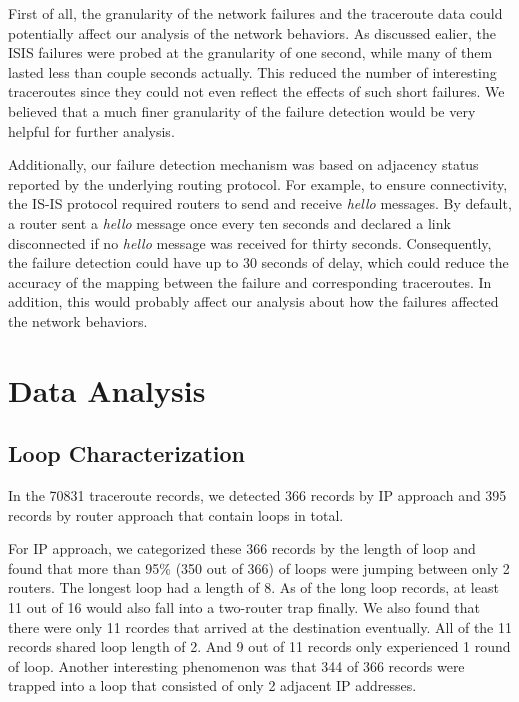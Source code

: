 \documentclass[conference, twocolumn, oneside, 10pt]{IEEEtran}
\begin{document}
First of all, the granularity of the network failures and the traceroute data could potentially affect our analysis of the network behaviors. As discussed ealier, the ISIS failures were probed at the granularity of one second, while many of them lasted less than couple seconds actually. This reduced the number of interesting traceroutes since they could not even reflect the effects of such short failures. We believed that a much finer granularity of the failure detection would be very helpful for further analysis.

Additionally, our failure detection mechanism was based on adjacency status reported by the underlying routing protocol. For example, to ensure connectivity, the IS-IS protocol required routers to send and receive \textit{hello} messages. By default, a router sent a \textit{hello} message once every ten seconds and declared a link disconnected if no \textit{hello} message was received for thirty seconds. Consequently, the failure detection could have up to 30 seconds of delay, which could reduce the accuracy of the mapping between the failure and corresponding traceroutes. In addition, this would probably affect our analysis about how the failures affected the network behaviors.

\section{Data Analysis}
\label{sec:sec6}

\subsection{Loop Characterization}
 
In the 70831 traceroute records, we detected 366 records by IP approach and 395 records by router approach that contain loops in total.

For IP approach, we categorized these 366 records by the length of loop and found that more than 95\% (350 out of 366) of loops were jumping between only 2 routers. The longest loop had a length of 8. As of the long loop records, at least 11 out of 16 would also fall into a two-router trap finally. We also found that there were only 11 rcordes that arrived at the destination eventually. All of the 11 records shared loop length of 2. And 9 out of 11 records only experienced 1 round of loop. Another interesting phenomenon was that 344 of 366 records were trapped into a loop that consisted of only 2 adjacent IP addresses.
\end{document}
